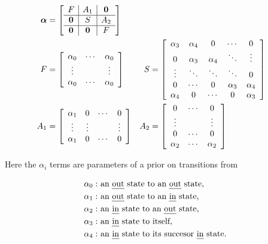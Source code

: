 \documentclass[12pt]{report}
\newcommand{\1}[0]{\mathbbm{1}}
\begin{document}
\begin{align*}
    \bm{\alpha} &= \left[\begin{array}{c | c | c} 
        F & A_1 & \bm{0} \\\hline 
        \bm{0} & S & A_2 \\\hline 
        \bm{0} & \bm{0} & F
    \end{array}\right] \\
    F &= \left[\begin{array}{c c c} 
        \alpha_0 & \cdots & \alpha_0 \\ 
        \vdots   &        & \vdots \\
        \alpha_0 & \cdots & \alpha_0 
    \end{array}\right] &
    S &= \left[\begin{array}{c c c c c}
        \alpha_3 & \alpha_4 & 0        & \cdots   & 0        \\
        0        & \alpha_3 & \alpha_4 & \ddots   & \vdots   \\
        \vdots   & \ddots   & \ddots   & \ddots   & 0        \\
        0        & \cdots   & 0        & \alpha_3 & \alpha_4 \\
        \alpha_4 & 0        & \cdots   & 0        & \alpha_3
    \end{array}\right] \\
    A_1 &= \left[\begin{array}{c c c c} 
        \alpha_1 & 0      & \cdots & 0 \\ 
        \vdots   & \vdots &        & \vdots \\
        \alpha_1 & 0      & \cdots & 0        
    \end{array}\right] &
    A_2 &= \left[\begin{array}{c c c} 
        0        & \cdots & 0 \\ 
        \vdots   &        & \vdots \\
        0        & \cdots & 0 \\ 
        \alpha_2 & \cdots & \alpha_2
    \end{array}\right]
\end{align*}

Here the $\alpha_i$ terms are parameters of a prior on transitions from

\begin{align*}
    \alpha_0: & \text{ an \emph{out} state to an \emph{out} state,}\\
    \alpha_1: & \text{ an \emph{out} state to an \emph{in} state,}\\
    \alpha_2: & \text{ an \emph{in} state to an \emph{out} state,}\\
    \alpha_3: & \text{ an \emph{in} state to itself,}\\
    \alpha_4: & \text{ an \emph{in} state to its succesor \emph{in} state.}\\
\end{align*}
\end{document}

